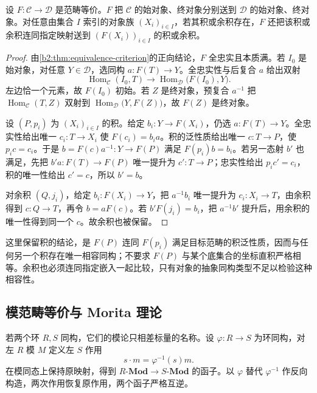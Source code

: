 \begin{proposition}\label{b2:prop:equivalence-preserves-universal-objects}
	设 \(F:\mathcal C\to\mathcal D\) 是范畴等价。\(F\) 把 \(\mathcal C\) 的始对象、终对象分别送到 \(\mathcal D\) 的始对象、终对象。对任意由集合 \(I\) 索引的对象族 \((X_i)_{i\in I}\)，若其积或余积存在，\(F\) 还把该积或余积连同指定映射送到 \((F(X_i))_{i\in I}\) 的积或余积。
\end{proposition}
\begin{proof}
	由\cref{b2:thm:equivalence-criterion}的正向结论，\(F\) 全忠实且本质满。若 \(I_0\) 是始对象，对任意 \(Y\in\mathcal D\)，选同构 \(a:F(T)\rightarrow Y\)。全忠实性与后复合 \(a\) 给出双射
	\[
		\operatorname{Hom}_{\mathcal C}(I_0,T) \longrightarrow\operatorname{Hom}_{\mathcal D}\bigl(F(I_0),Y\bigr).
	\]
	左边恰一个元素，故 \(F(I_0)\) 初始。若 \(Z\) 是终对象，预复合 \(a^{-1}\) 把 \(\operatorname{Hom}_{\mathcal C}(T,Z)\) 双射到 \(\operatorname{Hom}_{\mathcal D}\bigl(Y,F(Z)\bigr)\)，故 \(F(Z)\) 是终对象。

	设 \((P,p_i)\) 为 \((X_i)_{i\in I}\) 的积。给定 \(b_i:Y\rightarrow F(X_i)\)，仍选 \(a:F(T)\rightarrow Y\)。全忠实性给出唯一 \(c_i:T\rightarrow X_i\) 使 \(F(c_i)=b_i a\)。积的泛性质给出唯一 \(c:T\rightarrow P\)，使 \(p_i c=c_i\)。于是 \(b=F(c)a^{-1}:Y\rightarrow F(P)\) 满足 \(F(p_i)b=b_i\)。若另一态射 \(b'\) 也满足，先把 \(b'a:F(T)\rightarrow F(P)\) 唯一提升为 \(c':T\rightarrow P\)；忠实性给出 \(p_ic'=c_i\)，积的唯一性给出 \(c'=c\)，所以 \(b'=b\)。

	对余积 \((Q,j_i)\)，给定 \(b_i:F(X_i)\rightarrow Y\)，把 \(a^{-1}b_i\) 唯一提升为 \(c_i:X_i\rightarrow T\)，由余积得到 \(c:Q\rightarrow T\)，再令 \(b=aF(c)\)。若 \(b'F(j_i)=b_i\)，把 \(a^{-1}b'\) 提升后，用余积的唯一性得到同一个 \(c\)。故余积也被保留。
\end{proof}

这里保留积的结论，是 \(F(P)\) 连同 \(F(p_i)\) 满足目标范畴的积泛性质，因而与任何另一个积存在唯一相容同构；不要求 \(F(P)\) 与某个底集合的坐标直积严格相等。余积也必须连同指定嵌入一起比较，只有对象的抽象同构类型不足以检验这种相容性。

\subsection{模范畴等价与 Morita 理论}
\label{b2:subsec:0504:03}

若两个环 \(R,S\) 同构，它们的模论只相差标量的名称。设 \(\varphi:R\rightarrow S\) 为环同构，对左 \(R\) 模 \(M\) 定义左 \(S\) 作用
\[
	s\cdot m=\varphi^{-1}(s)m.
\]
在模同态上保持原映射，得到 \(R\text{-}\mathbf{Mod}\rightarrow S\text{-}\mathbf{Mod}\) 的函子。以 \(\varphi\) 替代 \(\varphi^{-1}\) 作反向构造，两次作用恢复原作用，两个函子严格互逆。

